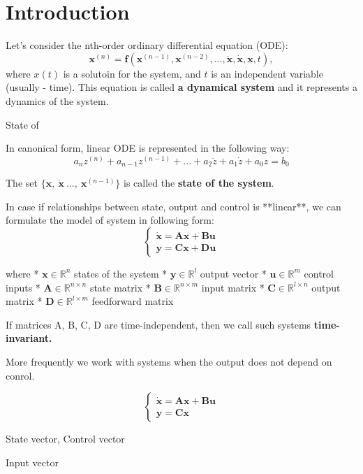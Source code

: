 
\section{Introduction}
\begin{tcolorbox}[colback=green!10,colframe=green!50!black,title=\textbf{Dynamical systems}]
    Let's consider the nth-order ordinary differential equation (ODE):
    \[\mathbf{x}^{(n)}=\mathbf{f}(\mathbf{x}^{(n-1)},\mathbf{x}^{(n-2)},...,\ddot{\mathbf{x}},\dot{\mathbf{x}},\mathbf{x},t),\]
    where $x(t)$ is a solutoin for the system, and $t$ is an independent variable (usually - time).
    This equation is called \textbf{a dynamical system} and it represents a dynamics of the system.

\end{tcolorbox}

State of 


In canonical form, linear ODE is represented in the following way:
\[a_{n}z^{(n)} +a_{n-1}z^{(n-1)}+...+a_{2}\ddot z+a_{1}\dot z + a_0 z= b_0\]

The set $\{ \mathbf{x}, \ \dot{\mathbf{x}} \ ..., \ \mathbf{x}^{(n-1)} \}$ is called the \textbf{state  of the system}.


In case if relationships between state, output and control is **linear**, we can formulate the model of system in following form:
\begin{equation}
\begin{cases}
\mathbf{\dot{x}} =\mathbf{A}\mathbf{x} + \mathbf{B}\mathbf{u} \\
\mathbf{y}=\mathbf{C}\mathbf{x} + \mathbf{D}\mathbf{u}
\end{cases}
\end{equation}

where
*   $\mathbf{x} \in \mathbb{R}^n$ states of the system
*   $\mathbf{y} \in \mathbb{R}^l$ output vector
*   $\mathbf{u} \in \mathbb{R}^m$ control inputs
*   $\mathbf{A} \in \mathbb{R}^{n \times n}$ state matrix
*   $\mathbf{B} \in \mathbb{R}^{n \times m}$ input matrix
*   $\mathbf{C} \in \mathbb{R}^{l \times n}$ output matrix
*   $\mathbf{D} \in \mathbb{R}^{l \times m}$ feedforward matrix

If matrices A, B, C, D are time-independent, then we call such systems \textbf{time-invariant.} 

More frequently we work with systems when the output does not depend on conrol. 

\begin{equation}
    \begin{cases}
    \mathbf{\dot{x}}=\mathbf{A}\mathbf{x} + \mathbf{B}\mathbf{u} \\
    \mathbf{y}=\mathbf{C}\mathbf{x}
    \end{cases}
    \end{equation}

State vector, 
Control vector


Input vector